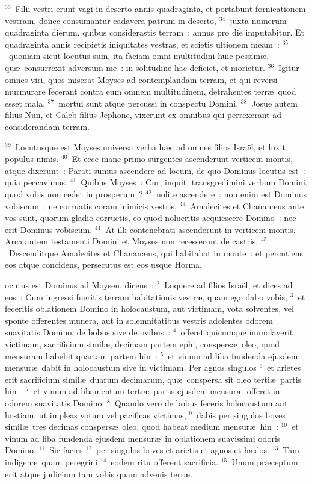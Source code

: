 ${}^{33}$~Filii vestri erunt vagi in deserto annis quadraginta, et portabunt fornicationem vestram, donec consumantur cadavera patrum in deserto,
${}^{34}$~juxta numerum quadraginta dierum, quibus considerastis terram~: annus pro die imputabitur. Et quadraginta annis recipietis iniquitates vestras, et scietis ultionem meam~:
${}^{35}$~quoniam sicut locutus sum, ita faciam omni multitudini huic pessim\ae , qu\ae\ consurrexit adversum me~: in solitudine hac deficiet, et morietur.
${}^{36}$~Igitur omnes viri, quos miserat Moyses ad contemplandam terram, et qui reversi murmurare fecerant contra eum omnem multitudinem, detrahentes terr\ae\ quod esset mala,
${}^{37}$~mortui sunt atque percussi in conspectu Domini.
${}^{38}$~Josue autem filius Nun, et Caleb filius Jephone, vixerunt ex omnibus qui perrexerant ad considerandam terram.


${}^{39}$~Locutusque est Moyses universa verba h\ae c ad omnes filios Isra\"el, et luxit populus nimis.
${}^{40}$~Et ecce mane primo surgentes ascenderunt verticem montis, atque dixerunt~: Parati sumus ascendere ad locum, de quo Dominus locutus est~: quia peccavimus.
${}^{41}$~Quibus Moyses~: Cur, inquit, transgredimini verbum Domini, quod vobis non cedet in prosperum~?
${}^{42}$~nolite ascendere~: non enim est Dominus vobiscum~: ne corruatis coram inimicis vestris.
${}^{43}$~Amalecites et Chanan\ae us ante vos sunt, quorum gladio corruetis, eo quod nolueritis acquiescere Domino~: nec erit Dominus vobiscum.
${}^{44}$~At illi contenebrati ascenderunt in verticem montis. Arca autem testamenti Domini et Moyses non recesserunt de castris.
${}^{45}$~Descenditque Amalecites et Chanan\ae us, qui habitabat in monte~: et percutiens eos atque concidens, persecutus est eos usque Horma.

\bchapter
{}ocutus est Dominus ad Moysen, dicens~:
${}^{2}$~Loquere ad filios Isra\"el, et dices ad eos~: Cum ingressi fueritis terram habitationis vestr\ae , quam ego dabo vobis,
${}^{3}$~et feceritis oblationem Domino in holocaustum, aut victimam, vota solventes, vel sponte offerentes munera, aut in solemnitatibus vestris adolentes odorem suavitatis Domino, de bobus sive de ovibus~:
${}^{4}$~offeret quicumque immolaverit victimam, sacrificium simil\ae , decimam partem ephi, conspers\ae\ oleo, quod mensuram habebit quartam partem hin~:
${}^{5}$~et vinum ad liba fundenda ejusdem mensur\ae\ dabit in holocaustum sive in victimam. Per agnos singulos
${}^{6}$~et arietes erit sacrificium simil\ae\ duarum decimarum, qu\ae\ conspersa sit oleo terti\ae\ partis hin~:
${}^{7}$~et vinum ad libamentum terti\ae\ partis ejusdem mensur\ae\ offeret in odorem suavitatis Domino.
${}^{8}$~Quando vero de bobus feceris holocaustum aut hostiam, ut impleas votum vel pacificas victimas,
${}^{9}$~dabis per singulos boves simil\ae\ tres decimas conspers\ae\ oleo, quod habeat medium mensur\ae\ hin~:
${}^{10}$~et vinum ad liba fundenda ejusdem mensur\ae\ in oblationem suavissimi odoris Domino.
${}^{11}$~Sic facies
${}^{12}$~per singulos boves et arietis et agnos et h\ae dos.
${}^{13}$~Tam indigen\ae\ quam peregrini
${}^{14}$~eodem ritu offerent sacrificia.
${}^{15}$~Unum pr\ae ceptum erit atque judicium tam vobis quam advenis terr\ae .


